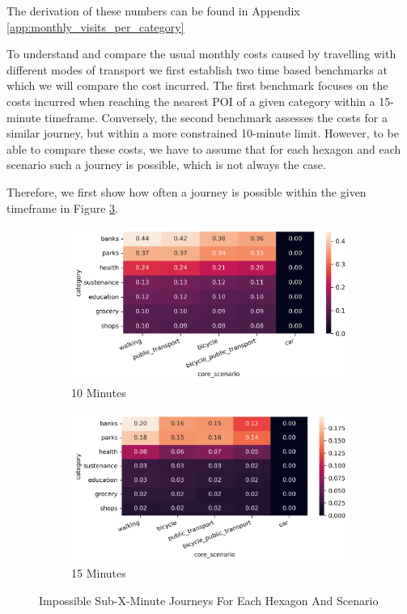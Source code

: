 The derivation of these numbers can be found in Appendix \ref{app:monthly_visits_per_category}

To understand and compare the usual monthly costs caused by travelling with different modes of transport we first establish two time based benchmarks at which we will compare the cost incurred.
The first benchmark focuses on the costs incurred when reaching the nearest POI of a given category within a 15-minute timeframe. 
Conversely, the second benchmark assesses the costs for a similar journey, but within a more constrained 10-minute limit.
However, to be able to compare these costs, we have to assume that for each hexagon and each scenario such a journey is possible, which is not always the case.

Therefore, we first show how often a journey is possible within the given timeframe in Figure \ref{fig:percentage_inf_x}.

\begin{figure}
  \centering
  \begin{subfigure}[b]{0.45\textwidth}
    \centering
    \includegraphics[width=\textwidth]{Figures/results/monthly_costs/percentage_inf_10.png}
    \caption{10 Minutes}
    \label{fig:percentage_inf_10}
  \end{subfigure}
  \hfill
  \begin{subfigure}[b]{0.45\textwidth}
    \centering
    \includegraphics[width=\textwidth]{Figures/results/monthly_costs/percentage_inf_15.png}
    \caption{15 Minutes}
    \label{fig:percentage_inf_15}
  \end{subfigure}
  \caption{Impossible Sub-X-Minute Journeys For Each Hexagon And Scenario}
  \label{fig:percentage_inf_x}
\end{figure}

